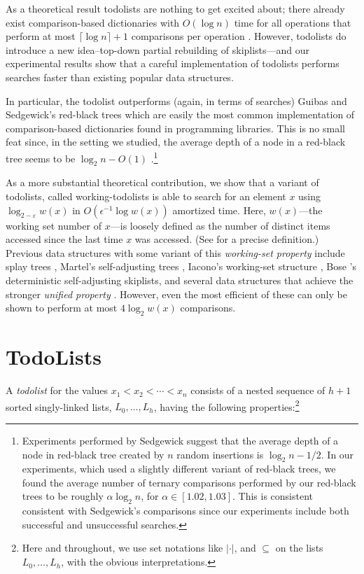 \documentclass[lotsofwhite]{patmorin}
\newcommand{\eps}{\varepsilon}
\begin{document}
As a theoretical result todolists are nothing to get excited about; there
already exist comparison-based dictionaries with $O(\log n)$ time for all
operations that perform at most $\lceil\log n\rceil+1$ comparisons per
operation \cite{S}. However, todolists do introduce a new idea--top-down
partial rebuilding of skiplists---and our experimental results show
that a careful implementation of todolists performs searches faster than
existing popular data structures.  

In particular, the todolist outperforms (again, in terms of searches)
Guibas and Sedgewick's red-black trees \cite{gsXX} which are easily
the most common implementation of comparison-based dictionaries found
in programming libraries. This is no small feat since, in the setting
we studied, the average depth of a node in a red-black tree seems to be
$\log_2 n - O(1)$ \cite{S}.\footnote{Experiments performed by Sedgewick
suggest that the average depth of a node in red-black tree created by $n$
random insertions is $\log_2 n - 1/2$. In our experiments, which used
a slightly different variant of red-black trees, we found the average
number of ternary comparisons performed by our red-black trees to be
roughly $\alpha\log_2 n$, for $\alpha\in[1.02,1.03]$.  This is consistent
consistent with Sedgewick's comparisons since our experiments include
both successful and unsuccessful searches.}

As a more substantial theoretical contribution, we show that a variant of
todolists, called working-todolists is able to search for an element $x$
using $\log_{2-\eps} w(x)$ in $O(\epsilon^{-1}\log w(x))$ amortized time.
Here, $w(x)$---the working set number of $x$---is loosely defined
as the number of distinct items accessed since the last time $x$ was
accessed. (See  for a precise definition.)
Previous data structures with some variant of this \emph{working-set
property} include splay trees \cite{S}, Martel's self-adjusting
trees \cite{X}, Iacono's working-set structure \cite{S}, Bose \etal's
deterministic self-adjusting skiplists, and several data structures that
achieve the stronger \emph{unified property} \cite{A,B,C}.  However,
even the most efficient of these can only be shown to perform at most
$4\log_2 w(x)$ comparisons.


\section{TodoLists}

A \emph{todolist} for the values $x_1<x_2<\cdots<x_n$ consists of a
nested sequence of $h+1$ sorted singly-linked lists, $L_0,\ldots,L_h$,
having the following properties:\footnote{Here and throughout, we use set
notations like $|\cdot|$, and $\subseteq$ on the lists $L_0,\ldots,L_h$,
with the obvious interpretations.}
\end{document}
